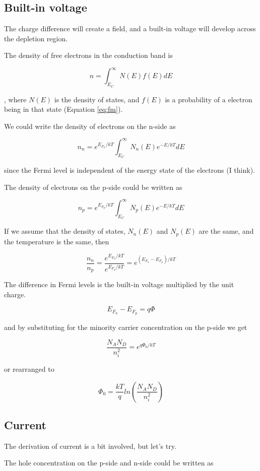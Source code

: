 \subsection{Built-in voltage}\label{built-in-voltage}

The charge difference will create a field, and a built-in voltage will
develop across the depletion region.

The density of free electrons in the conduction band is

\[
n = \int_{E_C}^{\infty} N(E) f(E) dE 
\]

, where \(N(E)\) is the density of states, and \(f(E)\) is a probability
of a electron being in that state (Equation \eqref{eq:fm}).

We could write the density of electrons on the n-side as

\[
n_n = e^{E_{F_n}/kT} \int_{E_C}^{\infty} N_n(E) e^{-E/kT}dE 
\]

since the Fermi level is independent of the energy state of the
electrons (I think).

The density of electrons on the p-side could be written as

\[
n_p = e^{E_{F_p}/kT} \int_{E_C}^{\infty} N_p(E) e^{-E/kT}dE 
\]

If we assume that the density of states, \(N_n(E)\) and \(N_p(E)\) are
the same, and the temperature is the same, then

\[
\frac{n_n}{n_p} = \frac{ e^{E_{F_n}/kT}}{e^{E_{F_p}/kT}} = e^{(E_{F_n} - E_{F_p})/kT}
\]

The difference in Fermi levels is the built-in voltage multiplied by the
unit charge.

\[
E_{F_n} - E_{F_p} = q\Phi
\]

and by substituting for the minority carrier concentration on the p-side
we get

\[\frac{N_A N_D}{n_i^2} = e^{q\Phi_0/kT}\]

or rearranged to

\[\Phi_0 = \frac{kT}{q} ln\left(  \frac{N_A N_D}{n_i^2} \right)\]

\subsection{Current}\label{current}

The derivation of current is a bit involved, but let's try.

The hole concentration on the p-side and n-side could be written as

